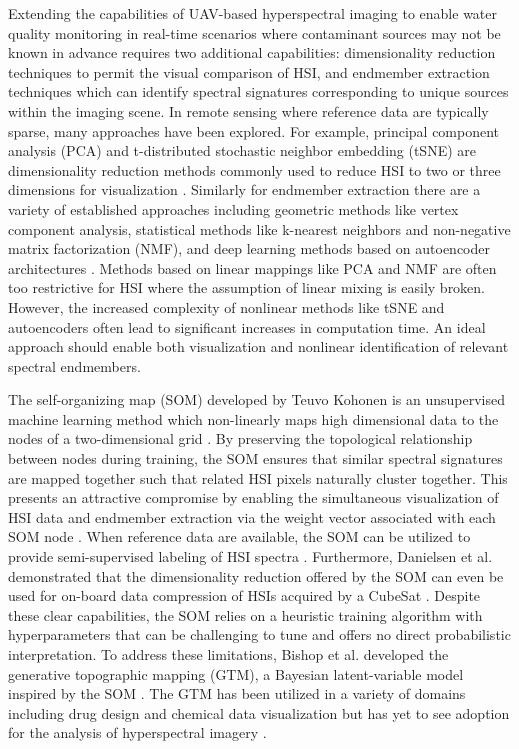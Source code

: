 \documentclass[remotesensing,article,submit,pdftex,moreauthors]{Definitions/mdpi}
\begin{document}
Extending the capabilities of UAV-based hyperspectral imaging to enable water quality monitoring in real-time scenarios where contaminant sources may not be known in advance requires two additional capabilities: dimensionality reduction techniques to permit the visual comparison of HSI, and endmember extraction techniques which can identify spectral signatures corresponding to unique sources within the imaging scene. In remote sensing where reference data are typically sparse, many approaches have been explored. For example, principal component analysis (PCA) and t-distributed stochastic neighbor embedding (tSNE) are dimensionality reduction methods commonly used to reduce HSI to two or three dimensions for visualization \cite{tyo2003principal,zhang2015hyperspectral}. Similarly for endmember extraction there are a variety of established approaches including geometric methods like vertex component analysis, statistical methods like k-nearest neighbors and non-negative matrix factorization (NMF), and deep learning methods based on autoencoder architectures \cite{heylen2014review,nascimento2005vertex, Feng2022HyperspectralUB, cariou2015unsupervised, su2019daen, borsoi2019deep, palsson2020convolutional}. Methods based on linear mappings like PCA and NMF are often too restrictive for HSI where the assumption of linear mixing is easily broken. However, the increased complexity of nonlinear methods like tSNE and autoencoders often lead to significant increases in computation time. An ideal approach should enable both visualization and nonlinear identification of relevant spectral endmembers.

The self-organizing map (SOM) developed by Teuvo Kohonen is an unsupervised machine learning method which non-linearly maps high dimensional data to the nodes of a two-dimensional grid \cite{kohonen-som-1}. By preserving the topological relationship between nodes during training, the SOM ensures that similar spectral signatures are mapped together such that related HSI pixels naturally cluster together. This presents an attractive compromise by enabling the simultaneous visualization of HSI data and endmember extraction via the weight vector associated with each SOM node \cite{cantero2004analysis, duran2007time,som-hsi}. When reference data are available, the SOM can be utilized to provide semi-supervised labeling of HSI spectra \cite{riese2019supervised}. Furthermore, Danielsen et al. demonstrated that the dimensionality reduction offered by the SOM can even be used for on-board data compression of HSIs acquired by a CubeSat \cite{danielsen2021self}. Despite these clear capabilities, the SOM relies on a heuristic training algorithm with hyperparameters that can be challenging to tune and offers no direct probabilistic interpretation. To address these limitations, Bishop et al. developed the generative topographic mapping (GTM), a Bayesian latent-variable model inspired by the SOM \cite{gtm-bishop-1}. The GTM has been utilized in a variety of domains including drug design and chemical data visualization but has yet to see adoption for the analysis of hyperspectral imagery \cite{kireeva2012generative, gaspar2015chemical, horvath2019generative}.
\end{document}
